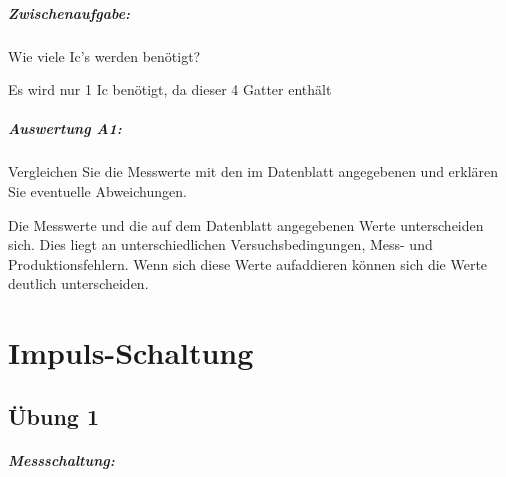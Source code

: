 \documentclass[11pt,a4paper,titlepage]{scrreprt}
\begin{document}
        \paragraph{Zwischenaufgabe:} Wie viele Ic's werden benötigt?
        
            Es wird nur 1 Ic benötigt, da dieser 4 Gatter enthält
        
        \paragraph{Auswertung A1:} Vergleichen Sie die Messwerte mit den im Datenblatt angegebenen und erklären Sie
        eventuelle Abweichungen.

          Die Messwerte und die auf dem Datenblatt angegebenen Werte unterscheiden sich. Dies liegt an unterschiedlichen Versuchsbedingungen, Mess- und Produktionsfehlern. Wenn sich diese Werte aufaddieren können sich die Werte deutlich unterscheiden.

  \chapter{Impuls-Schaltung}
    \section{Übung 1}
      \paragraph{Messschaltung:}
\end{document}

